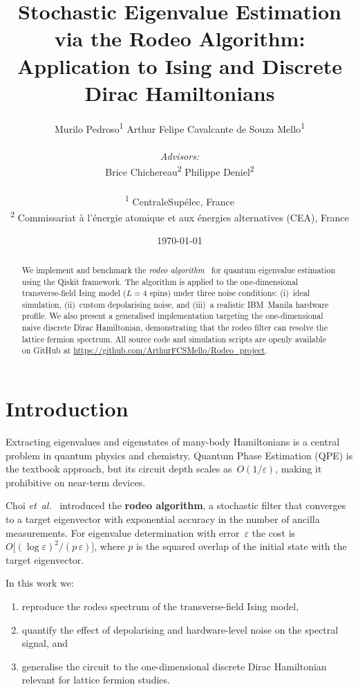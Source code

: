 \documentclass[twocolumn,10pt]{article}
\title{\textbf{Stochastic Eigenvalue Estimation via the Rodeo Algorithm:\\
Application to Ising and Discrete Dirac Hamiltonians}}
\author{
Murilo Pedroso\textsuperscript{1} \quad\quad 
Arthur Felipe Cavalcante de Souza Mello\textsuperscript{1} \\
\vspace{0.1cm} \\
\textit{Advisors:}\\
Brice Chichereau\textsuperscript{2} \quad\quad Philippe Deniel\textsuperscript{2} \\
\vspace{0.1cm} \\
\small\textsuperscript{1} CentraleSup\'elec, France \\
\small\textsuperscript{2} Commissariat \`a l'\'energie atomique et aux \'energies alternatives (CEA), France
}
\date{\today}
\begin{document}
\maketitle

\begin{abstract}
We implement and benchmark the \emph{rodeo algorithm}~\cite{choi2021}
for quantum eigenvalue estimation using the Qiskit framework.
The algorithm is applied to the one-dimensional transverse-field Ising
model ($L=4$ spins) under three noise conditions:
(i)~ideal simulation,
(ii)~custom depolarising noise, and
(iii)~a realistic IBM~Manila hardware profile.
We also present a generalised implementation targeting the
one-dimensional naive discrete Dirac Hamiltonian,
demonstrating that the rodeo filter can resolve the lattice fermion
spectrum.
All source code and simulation scripts are openly available on GitHub at 
\url{https://github.com/ArthurFCSMello/Rodeo_project}.
\end{abstract}

\section{Introduction}\label{sec:intro}
Extracting eigenvalues and eigenstates of many-body Hamiltonians is a
central problem in quantum physics and chemistry.
Quantum Phase Estimation (QPE) is the textbook approach, but its
circuit depth scales as~$O(1/\varepsilon)$, making it prohibitive on
near-term devices.

Choi \emph{et~al.}~\cite{choi2021} introduced the \textbf{rodeo
algorithm}, a stochastic filter that converges to a target eigenvector
with exponential accuracy in the number of ancilla measurements.
For eigenvalue determination with error~$\varepsilon$ the cost is
$O\!\bigl[(\log\varepsilon)^{2}/(p\,\varepsilon)\bigr]$,
where $p$ is the squared overlap of the initial state with the target
eigenvector.

In this work we:
\begin{enumerate}
\item reproduce the rodeo spectrum of the transverse-field Ising model,
\item quantify the effect of depolarising and hardware-level noise on
      the spectral signal, and
\item generalise the circuit to the one-dimensional discrete Dirac
      Hamiltonian relevant for lattice fermion studies.
\end{enumerate}
\end{document}
